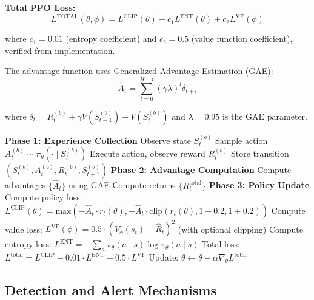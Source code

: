 \documentclass[12pt,twoside]{article}
\theoremstyle{definition}
\theoremstyle{plain}
\begin{document}
\textbf{Total PPO Loss:}
\begin{equation}
L^{\text{TOTAL}}(\theta, \phi) = L^{\text{CLIP}}(\theta) - c_1 L^{\text{ENT}}(\theta) + c_2 L^{\text{VF}}(\phi)
\end{equation}

where $c_1 = 0.01$ (entropy coefficient) and $c_2 = 0.5$ (value function coefficient), verified from implementation.

The advantage function uses Generalized Advantage Estimation (GAE):
\begin{equation}
\hat{A}_t = \sum_{l=0}^{H-t} (\gamma \lambda)^l \delta_{t+l}
\end{equation}

where $\delta_t = R_t^{(b)} + \gamma V(S_{t+1}^{(b)}) - V(S_t^{(b)})$ and $\lambda = 0.95$ is the GAE parameter.

\begin{algorithm}
\caption{PPO Training for Blue Agent (Verified Implementation)}
\begin{algorithmic}[1]
\STATE \textbf{Phase 1: Experience Collection}
        \STATE Observe state $S_t^{(b)}$
        \STATE Sample action $A_t^{(b)} \sim \pi_\theta(\cdot \mid S_t^{(b)})$
        \STATE Execute action, observe reward $R_t^{(b)}$
        \STATE Store transition $(S_t^{(b)}, A_t^{(b)}, R_t^{(b)}, S_{t+1}^{(b)})$
    \ENDFOR
\ENDFOR
\STATE \textbf{Phase 2: Advantage Computation}
\STATE Compute advantages $\{\hat{A}_t\}$ using GAE
\STATE Compute returns $\{R_t^{\text{total}}\}$
\STATE \textbf{Phase 3: Policy Update}
        \STATE Compute policy loss: $L^{\text{CLIP}}(\theta) = \text{max}(-\hat{A}_t \cdot r_t(\theta), -\hat{A}_t \cdot \text{clip}(r_t(\theta), 1-0.2, 1+0.2))$
        \STATE Compute value loss: $L^{\text{VF}}(\phi) = 0.5 \cdot (V_\phi(s_t) - \hat{R}_t)^2$ (with optional clipping)
        \STATE Compute entropy loss: $L^{\text{ENT}} = -\sum_a \pi_\theta(a \mid s) \log \pi_\theta(a \mid s)$
        \STATE Total loss: $L^{\text{total}} = L^{\text{CLIP}} - 0.01 \cdot L^{\text{ENT}} + 0.5 \cdot L^{\text{VF}}$
        \STATE Update: $\theta \leftarrow \theta - \alpha \nabla_\theta L^{\text{total}}$
    \ENDFOR
\ENDFOR
\end{algorithmic}
\end{algorithm}

\subsection{Detection and Alert Mechanisms}
\end{document}

